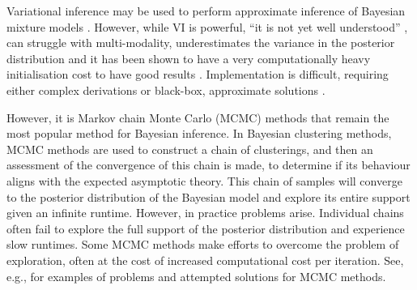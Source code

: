 \documentclass{article}
\begin{document}


Variational inference \citep[\textbf{VI},][]{blei2006variational} may be used to perform approximate inference of Bayesian mixture models \citep{martin2020computing}. However,
while VI is powerful, ``it is not yet well understood'' \citep{blei2017variational}, can struggle with multi-modality, underestimates the variance in the posterior distribution \citep{two2011turner} and it has been shown to have a very computationally heavy initialisation cost to have good results \citep{wang2011fast}. Implementation is difficult, requiring either complex derivations \citep[see the Appendix Supplementary Methods of][for an example]{argelaguet2018multi} or black-box, approximate solutions \citep{kucukelbir2017automatic}.

However, it is Markov chain Monte Carlo (MCMC) methods that remain the most popular method for Bayesian inference. In Bayesian clustering methods, MCMC methods are used to construct a chain of clusterings, and then an assessment of the convergence of this chain is made, to determine if its behaviour aligns with the expected asymptotic theory. This chain of samples will converge to the posterior distribution of the Bayesian model and explore its entire support given an infinite runtime. However, in practice problems arise. Individual chains often fail to explore the full support of the posterior distribution \citep[an example of different chains becoming trapped in a single mode of the likelihood surface can be seen in the Supplementary Materials of ][]{strauss2020gpseudoclust} and experience slow runtimes. Some MCMC methods make efforts to overcome the problem of exploration, often at the cost of increased computational cost per iteration. See, e.g., \cite{robert2018accelerating, yao2020stacking} for examples of problems and attempted solutions for MCMC methods.
\end{document}
